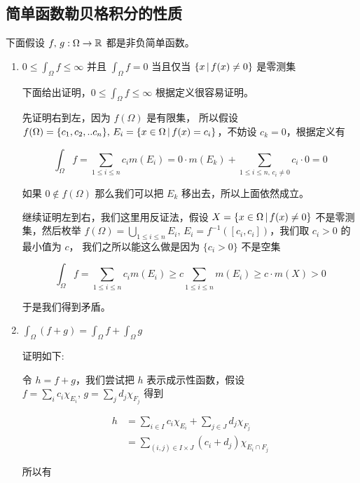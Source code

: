 \subsection{简单函数勒贝格积分的性质}

下面假设 $f,\,g: \Omega \to \mathbb{R}$ 都是非负简单函数。

\begin{enumerate}
    \item $0 \le \int_{\Omega}f \le \infty$ 并且 $\int_{\Omega} f =0$ 当且仅当 $\{ x \,\vert\, f(x) \ne 0 \}$ 是零测集

    下面给出证明，$0 \le \int_{\Omega}f \le \infty$ 根据定义很容易证明。

    先证明右到左，因为 $f(\Omega)$ 是有限集， 所以假设 $f(\Omega) = \{ c_1,c_2,.. c_n\},\, E_i = \{x \in \Omega \,\vert\, f(x) = c_i\}$，不妨设 $c_k = 0$，根据定义有

    \[
        \int_{\Omega}f = \sum_{1 \le i \le n}c_i m(E_i) = 0 \cdot m(E_k) + \sum_{1 \le i \le n,\, c_i \ne 0}c_i \cdot 0  = 0
    \]

    如果 $0 \notin f(\Omega)$ 那么我们可以把 $E_k$ 移出去，所以上面依然成立。


    继续证明左到右，我们这里用反证法，假设 $X= \{ x \in \Omega \,\vert\, f(x) \ne 0 \} $ 不是零测集，然后枚举 $f(\Omega) = \bigcup_{1 \le i \le n}E_i,\, E_i = f^{-1}([c_i, c_i])$，我们取 $c_i > 0$ 的最小值为 $c$，
    我们之所以能这么做是因为 $\{ c_i > 0\}$ 不是空集

    \[
    \int_{\Omega}f = \sum_{1 \le i \le n}c_i m(E_i) \ge c\sum_{1 \le i \le n} m(E_i) \ge c \cdot m(X) > 0
    \]

    于是我们得到矛盾。

    \item $\int_{\Omega}(f + g) = \int_{\Omega}f + \int_{\Omega}g$

    证明如下:

    令 $h = f + g$，我们尝试把 $h$ 表示成示性函数，假设 $f = \sum_{i} c_i \chi_{E_i},\, g = \sum_{j} d_j \chi_{F_j}$ 得到

    \begin{align*}
    h &= \sum_{i \in I} c_i \chi_{E_i} + \sum_{j \in J} d_j \chi_{F_j}  \\
    &=  \sum_{(i,j) \in I \times J} (c_i + d_j) \chi_{E_i \cap F_j}
    \end{align*}

    所以有


\end{enumerate}

